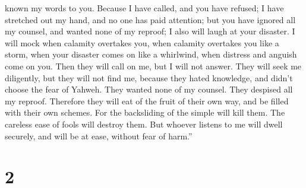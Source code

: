 known my words to you.  Because I have called, and you
have refused; I have stretched out my hand, and no one has paid
attention;  but you have ignored all my counsel, and
wanted none of my reproof;  I also will laugh at your
disaster. I will mock when calamity overtakes you,  when
calamity overtakes you like a storm, when your disaster comes on like a
whirlwind, when distress and anguish come on you.  Then
they will call on me, but I will not answer. They will seek me
diligently, but they will not find me,  because they
hated knowledge, and didn't choose the fear of Yahweh. 
They wanted none of my counsel. They despised all my reproof.
 Therefore they will eat of the fruit of their own way,
and be filled with their own schemes.  For the
backsliding of the simple will kill them. The careless ease of fools
will destroy them.  But whoever listens to me will dwell
securely, and will be at ease, without fear of harm.''

\hypertarget{section-1}{%
\section{2}\label{section-1}}

